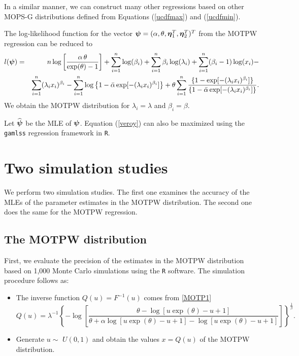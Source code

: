 \documentclass[12pt]{article}
\newcommand{\etn}{{\mbox{\boldmath $\eta$}}}
\newcommand{\psin}{{\mbox{\boldmath $\psi$}}}
\begin{document}
In a similar manner, we can construct many other regressions based on other MOPS-G distributions defined
from Equations (\ref{ucdfmax}) and (\ref{ucdfmin}).

The log-likelihood function for the vector $\psin=(\alpha,\theta,\etn_{1}^{T},\etn_{2}^{T})^{T}$
from the MOTPW regression can be reduced to
\begin{eqnarray}\label{veroy}
l(\psin)&=&n\log\left[\frac{\alpha\,\theta}{\exp(\theta)-1}\right]+\sum_{i=1}^{n}\log(\beta_{i})+\sum_{i=1}^{n}\beta_{i}\log(\lambda_{i})
+\sum_{i=1}^{n}(\beta_{i}-1)\log(x_{i})-\nonumber \\&&
\sum_{i=1}^{n}(\lambda_{i}x_{i})^{\beta_{i}}-\sum_{i=1}^{n}\log\left\{1-\bar{\alpha}\exp[-(\lambda_{i}x_{i})^{\beta_{i}}]\right\}
+\theta\sum_{i=1}^{n}\frac{\{1-\exp[-(\lambda_{i}x_{i})^{\beta_{i}}]\}}
{\{1-\bar{\alpha}\exp[-(\lambda_{i}x_{i})^{\beta_{i}}]\}}.
\end{eqnarray}
We obtain the MOTPW distribution for $\lambda_{i}=\lambda$ and $\beta_{i}=\beta$.

Let $\widehat\psin$ be the MLE of $\psin$. Equation (\ref{veroy}) can also be maximized using the \texttt{gamlss} 
regression framework \citep{Stasinopoulos2007} in \texttt{R}.

\section{Two simulation studies}\label{sec:simulation}

We perform two simulation studies. The first one examines the accuracy of the MLEs of
the parameter estimates in the MOTPW distribution. The second one does the same for the MOTPW regression.


\subsection{The MOTPW distribution}

First, we evaluate the precision of the estimates in the MOTPW distribution based on 1,000 Monte Carlo simulations using the \texttt{R} software.
The simulation procedure follows as:
\begin{itemize}
\item The inverse function $Q(u)=F^{- 1}(u)$ comes from \eqref{MOTP1}
\begin{equation}\label{quantilica}
Q(u)={\lambda^{-1}}{\left\{-\log\left[\frac{\theta-\log[u\exp(\theta)-u+1]}{\theta+\alpha\log[u\exp(\theta)-u+1]-\log[u\exp(\theta)-u+1]}\right]\right\}^{\frac{1}{\beta}}}.
\end{equation}
\item Generate $u\sim$ $U(0,1)$ and obtain the values $x=Q(u)$ of the MOTPW distribution.
\end{itemize}
\end{document}
